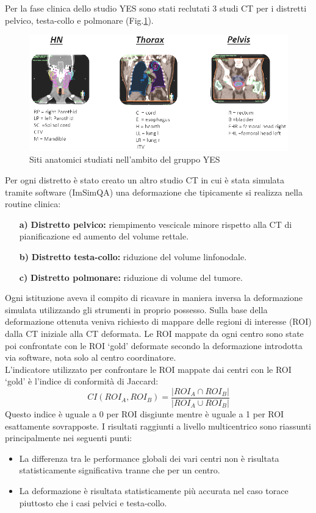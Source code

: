 Per la fase clinica dello studio YES sono stati reclutati 3 studi CT per i distretti pelvico, testa-collo e polmonare (Fig.\ref{fig:YES_sites}).
\begin{figure}
\centering
\includegraphics[width=\textwidth]{./cap3/YES_Sites.png}
\caption{Siti anatomici studiati nell'ambito del gruppo YES}
\label{fig:YES_sites}
\end{figure}
Per ogni distretto è stato creato un altro studio CT in cui è stata simulata tramite software (ImSimQA) una deformazione che tipicamente si realizza nella routine clinica:
\begin{itemize}
\item[\textbf{a)}] \textbf{Distretto pelvico:} riempimento vescicale minore rispetto alla CT di pianificazione ed aumento del volume rettale.
\item[\textbf{b)}] \textbf{Distretto testa-collo:} riduzione del volume linfonodale.
\item[\textbf{c)}] \textbf{Distretto polmonare:} riduzione di volume del tumore.
\end{itemize}
Ogni istituzione aveva il compito di ricavare in maniera inversa la deformazione simulata utilizzando gli strumenti in proprio possesso. Sulla base della deformazione ottenuta veniva richiesto di mappare delle regioni di interesse (ROI) dalla CT iniziale alla CT deformata. Le ROI mappate da ogni centro sono state poi confrontate con le ROI `gold' deformate secondo la deformazione introdotta via software, nota solo al centro coordinatore.\\
L'indicatore utilizzato per confrontare le ROI mappate dai centri con le ROI `gold' è l'indice di conformità di Jaccard:
\begin{equation}
CI(ROI_{A},ROI_{B}) = \frac{|ROI_{A} \cap ROI_{B}|}{|ROI_{A} \cup ROI_{B}|}
\end{equation}
Questo indice è uguale a 0 per ROI disgiunte mentre è uguale a 1 per ROI esattamente sovrapposte.
I risultati raggiunti a livello multicentrico sono riassunti principalmente nei seguenti punti:
\begin{itemize}
\item La differenza tra le performance globali dei vari centri non è risultata statisticamente significativa tranne che per un centro. 
\item La deformazione è risultata statisticamente più accurata  nel caso torace piuttosto che i casi pelvici e testa-collo.
\end{itemize}


